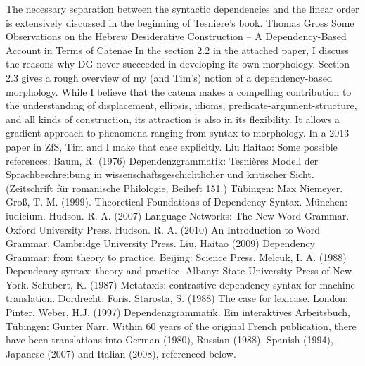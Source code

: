 %
%
%
%
The necessary separation between the syntactic dependencies and the linear order is extensively
discussed in the beginning of Tesniere's book.
%
Thomas Gross
Some Observations on the Hebrew Desiderative Construction – A Dependency-Based Account in Terms of Catenae
%
In the section 2.2 in the attached paper, I discuss the reasons why DG never succeeded in developing its own morphology. Section 2.3 gives a rough overview of my (and Tim's) notion of a dependency-based morphology.
%
While I believe that the catena makes a compelling contribution to the understanding of displacement, ellipsis, idioms, predicate-argument-structure, and all kinds of construction, its attraction is also in its flexibility. It allows a gradient approach to phenomena ranging from syntax to morphology. In a 2013 paper in ZfS, Tim and I make that case explicitly.
%
Liu Haitao:
%
Some possible references:
%
Baum, R. (1976) Dependenzgrammatik: Tesnières Modell der Sprachbeschreibung in wissenschaftsgeschichtlicher und kritischer Sicht. (Zeitschrift für romanische Philologie, Beiheft 151.) Tübingen: Max Niemeyer.
Groß, T. M. (1999). Theoretical Foundations of Dependency Syntax. München: iudicium.
Hudson. R. A. (2007) Language Networks: The New Word Grammar. Oxford University Press.
Hudson. R. A. (2010) An Introduction to Word Grammar. Cambridge University Press.
Liu, Haitao (2009) Dependency Grammar: from theory to practice. Beijing: Science Press. 
Melcuk, I. A. (1988) Dependency syntax: theory and practice. Albany: State University Press of New York.
Schubert, K. (1987) Metataxis: contrastive dependency syntax for machine translation. Dordrecht: Foris.
Starosta, S. (1988) The case for lexicase. London: Pinter.
Weber, H.J. (1997) Dependenzgrammatik. Ein interaktives Arbeitsbuch, Tübingen: Gunter Narr.
%
Within 60 years of the original French publication, there have been translations into German (1980), Russian (1988), Spanish (1994), Japanese (2007) and Italian (2008), referenced below.
